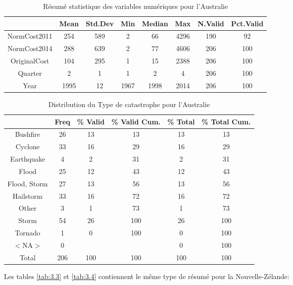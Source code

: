 \begin{table}[ht]
\centering
\begin{tabular}{cccccccc}
  \hline
 & Mean & Std.Dev & Min & Median & Max & N.Valid & Pct.Valid \\ 
  \hline
NormCost2011 & 254 & 589 & 2 & 66 & 4296 & 190 & 92 \\ 
  NormCost2014 & 288 & 639 & 2 & 77 & 4606 & 206 & 100 \\ 
  OriginalCost & 104 & 295 & 1 & 15 & 2388 & 206 & 100 \\ 
  Quarter & 2 & 1 & 1 & 2 & 4 & 206 & 100 \\ 
  Year & 1995 & 12 & 1967 & 1998 & 2014 & 206 & 100 \\ 
   \hline
\end{tabular}
\caption{Résumé statistique des variables numériques pour l'Australie} 
\label{tab:3.1}
\end{table}%
\begin{table}[ht]
\centering
\begin{tabular}{cccccc}
  \hline
 & Freq & \% Valid & \% Valid Cum. & \% Total & \% Total Cum. \\ 
  \hline
Bushfire & 26 & 13 & 13 & 13 & 13 \\ 
  Cyclone & 33 & 16 & 29 & 16 & 29 \\ 
  Earthquake & 4 & 2 & 31 & 2 & 31 \\ 
  Flood & 25 & 12 & 43 & 12 & 43 \\ 
  Flood, Storm & 27 & 13 & 56 & 13 & 56 \\ 
  Hailstorm & 33 & 16 & 72 & 16 & 72 \\ 
  Other & 3 & 1 & 73 & 1 & 73 \\ 
  Storm & 54 & 26 & 100 & 26 & 100 \\ 
  Tornado & 1 & 0 & 100 & 0 & 100 \\ 
  $<$NA$>$ & 0 &  &  & 0 & 100 \\ 
  Total & 206 & 100 & 100 & 100 & 100 \\ 
   \hline
\end{tabular}
\caption{Distribution du Type de catastrophe pour l'Australie} 
\label{tab:3.2}
\end{table}
Les tables \ref{tab:3.3} et \ref{tab:3.4} contiennent le même type de résumé pour la Nouvelle-Zélande:
